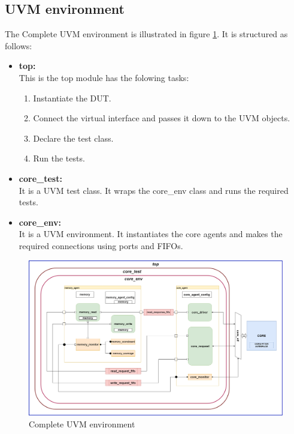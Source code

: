 \documentclass[../main.tex]{subfiles}
\begin{document}
\subsection{UVM environment}
The Complete UVM environment is illustrated in figure \ref{fig:UVM_env}. It is structured as follows:

\begin{itemize}
\item 	\textbf{top:}\\
This is the top module has the folowing tasks:
\begin{enumerate}
    \item Instantiate the DUT.
    \item Connect the virtual interface and passes it down to the UVM objects.
    \item Declare the test class.
    \item Run the tests.
\end{enumerate}
\item 	\textbf{core\_test:}\\
It is a UVM test class. It wraps the core\_env class and runs the required tests.
\item 	\textbf{core\_env:}\\
It is a UVM environment. It instantiates the core agents and makes the required connections using ports and FIFOs.
\end{itemize}

\begin{figure}[p]
\centering
\includegraphics[scale = 0.38, angle = 90]{diagrams/UVM_CORE_ENVIRONMENT.png}

\caption{Complete UVM environment}
\label{fig:UVM_env}
\end{figure}
\end{document}
